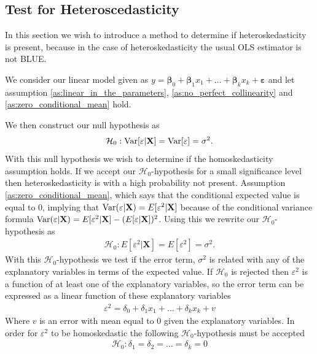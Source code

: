 \subsection{Test for Heteroscedasticity}
In this section we wish to introduce a method to determine if heteroskedasticity is present, because in the case of heteroskedasticity the usual OLS estimator is not BLUE. 

We consider our linear model given as $y = \mathbf{\beta}_0 + \mathbf{\beta}_1x_1 + \ldots + \mathbf{\beta}_kx_k + \mathbf{\varepsilon}$ and let assumption \ref{as:linear_in_the_parameters}, \ref{as:no_perfect_collinearity} and \ref{as:zero_conditional_mean} hold.

We then construct our null hypothesis as
\begin{align*}
    \mathcal{H}_0 : \operatorname{\text{Var}}[\varepsilon | \mathbf{X}] = \operatorname{\text{Var}}[\varepsilon] = \sigma^2. 
\end{align*}
With this null hypothesis we wish to determine if the homoskedasticity assumption holds. 
If we accept our $\mathcal{H}_0$-hypothesis for a small significance level then heteroskedasticity is with a high probability not present.
Assumption \ref{as:zero_conditional_mean}, which says that the conditional expected value is equal to $0$, implying that $\operatorname{\text{Var}}(\varepsilon | \mathbf{X}) = E[\varepsilon^2 | \mathbf{X}]$ because of the conditional variance formula $\operatorname{\text{Var}}(\varepsilon | \mathbf{X}) = E[\varepsilon^2 | \mathbf{X}] - (E[\varepsilon | \mathbf{X}])^2$. Using this we rewrite our $\mathcal{H}_0$-hypothesis as
\begin{align*}
    \mathcal{H}_0 : E[\varepsilon^2 | \mathbf{X}] = E[\varepsilon^2] = \sigma^2.
\end{align*}
With this $\mathcal{H}_0$-hypothesis we test if the error term, $\sigma^2$ is related with any of the explanatory variables in terms of the expected value.  
If $\mathcal{H}_0$ is rejected then $\varepsilon^2$ is a function of at least one of the explanatory variables, so the error term can be expressed as a linear function of these explanatory variables
\begin{align}\label{eq:test_hetero_nul_hypotese}
    \varepsilon^2 = \delta_0 + \delta_1x_1 + \ldots + \delta_kx_k + v
\end{align}
Where $v$ is an error with mean equal to $0$ given the explanatory variables. In order for $\varepsilon^2$ to be homoskedastic the following $\mathcal{H}_0$-hypothesis must be accepted 
\begin{align}\label{eq:H_nul_for_hetero_med_delta}
    \mathcal{H}_0 : \delta_1 = \delta_2 = \ldots = \delta_k = 0
\end{align}
